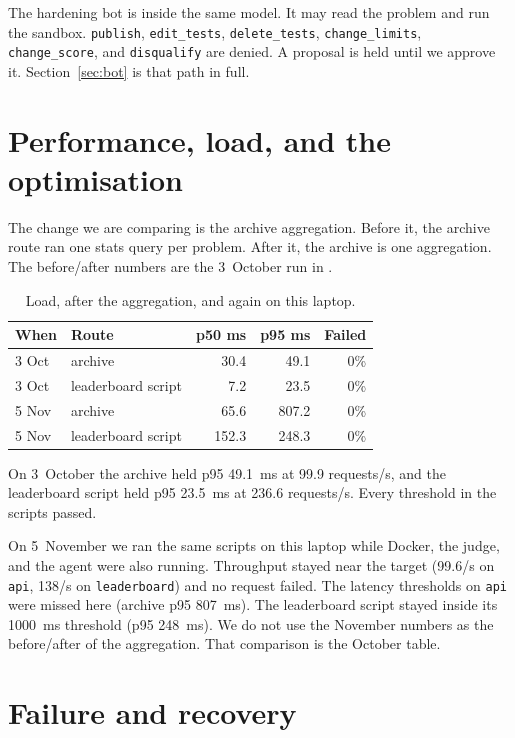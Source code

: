 \documentclass[11pt,a4paper]{article}
\begin{document}
The hardening bot is inside the same model. It may read the problem and run the sandbox. \texttt{publish}, \texttt{edit\_tests}, \texttt{delete\_tests}, \texttt{change\_limits}, \texttt{change\_score}, and \texttt{disqualify} are denied. A proposal is held until we approve it. Section~\ref{sec:bot} is that path in full.

\section{Performance, load, and the optimisation}
\label{sec:perf}

The change we are comparing is the archive aggregation. Before it, the archive route ran one stats query per problem. After it, the archive is one aggregation. The before/after numbers are the 3~October run in .

\begin{table}[ht]
\centering
\caption{Load, after the aggregation, and again on this laptop.}
\label{tab:k6}
{\small
\begin{tabular}{@{}l l r r r@{}}
\toprule
When & Route & p50 ms & p95 ms & Failed \\
\midrule
3 Oct & archive & 30.4 & 49.1 & 0\% \\
3 Oct & leaderboard script & 7.2 & 23.5 & 0\% \\
5 Nov & archive & 65.6 & 807.2 & 0\% \\
5 Nov & leaderboard script & 152.3 & 248.3 & 0\% \\
\bottomrule
\end{tabular}
}
\end{table}

On 3~October the archive held p95 49.1~ms at 99.9 requests/s, and the leaderboard script held p95 23.5~ms at 236.6 requests/s. Every threshold in the scripts passed.

On 5~November we ran the same scripts on this laptop while Docker, the judge, and the agent were also running. Throughput stayed near the target (99.6/s on \texttt{api}, 138/s on \texttt{leaderboard}) and no request failed. The latency thresholds on \texttt{api} were missed here (archive p95 807~ms). The leaderboard script stayed inside its 1000~ms threshold (p95 248~ms). We do not use the November numbers as the before/after of the aggregation. That comparison is the October table.

\section{Failure and recovery}
\label{sec:fail}
\end{document}
